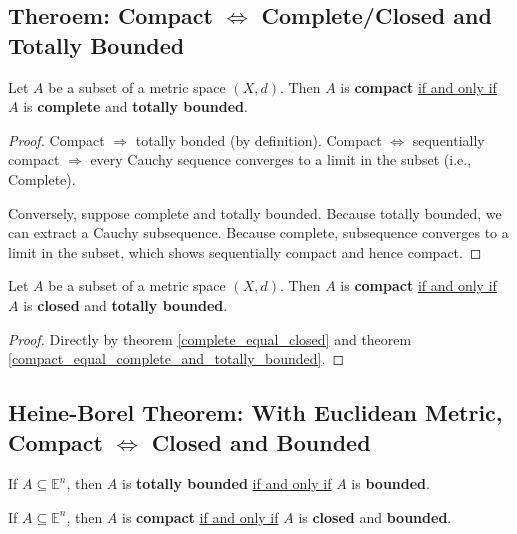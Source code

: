\documentclass[11pt]{elegantbook}
\begin{document}
\subsection{Theroem: Compact $\Leftrightarrow$ Complete/Closed and Totally Bounded}
\begin{theorem}\label{compact_equal_complete_and_totally_bounded}
    Let $A$ be a subset of a metric space $(X, d)$. Then $A$ is \textbf{compact} \underline{if and only if} $A$ is \textbf{complete} and \textbf{totally bounded}.
\end{theorem}
\begin{proof}
    Compact $\Rightarrow$ totally bonded (by definition). Compact $\Leftrightarrow$ sequentially compact $\Rightarrow$ every Cauchy sequence converges to a limit in the subset (i.e., Complete).

    Conversely, suppose complete and totally bounded. Because totally bounded, we can extract a Cauchy subsequence. Because complete, subsequence converges to a limit in the subset, which shows sequentially compact and hence compact.
\end{proof}
\begin{corollary}
    Let $A$ be a subset of a metric space $(X, d)$. Then $A$ is \textbf{compact} \underline{if and only if} $A$ is \textbf{closed} and \textbf{totally bounded}.
\end{corollary}
\begin{proof}
    Directly by theorem \ref{complete_equal_closed} and theorem \ref{compact_equal_complete_and_totally_bounded}.
\end{proof}

\subsection{Heine-Borel Theorem: With Euclidean Metric, Compact $\Leftrightarrow$ Closed and Bounded}
\begin{claim}
    If $A \subseteq \mathbb{E}^n$, then $A$ is \textbf{totally bounded} \underline{if and only if} $A$ is \textbf{bounded}.
\end{claim}

\begin{theorem}
    If $A \subseteq \mathbb{E}^n$, then $A$ is \textbf{compact} \underline{if and only if} $A$ is \textbf{closed} and \textbf{bounded}.
\end{theorem}
\end{document}
